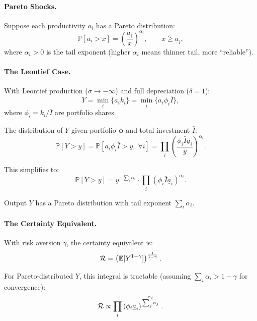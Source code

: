 \paragraph{Pareto Shocks.}
Suppose each productivity $a_i$ has a Pareto distribution:
\begin{equation}
\mathbb{P}[a_i > x] = \left( \frac{\underline{a}_i}{x} \right)^{\alpha_i}, \qquad x \geq \underline{a}_i,
\label{eq:ac-adv-pareto}
\end{equation}
where $\alpha_i > 0$ is the tail exponent (higher $\alpha_i$ means thinner tail, more ``reliable'').

\paragraph{The Leontief Case.}
With Leontief production ($\sigma \to -\infty$) and full depreciation ($\delta = 1$):
\begin{equation}
Y = \min_i \{ a_i k_i \} = \min_i \{ a_i \phi_i \bar{I} \},
\label{eq:ac-adv-Y-leontief}
\end{equation}
where $\phi_i = k_i / \bar{I}$ are portfolio shares.

The distribution of $Y$ given portfolio $\boldsymbol{\phi}$ and total investment $\bar{I}$:
\begin{equation}
\mathbb{P}[Y > y] = \mathbb{P}\left[ a_i \phi_i \bar{I} > y, \; \forall i \right] = \prod_i \left( \frac{\phi_i \bar{I} \underline{a}_i}{y} \right)^{\alpha_i}.
\label{eq:ac-adv-Y-dist}
\end{equation}

This simplifies to:
\begin{equation}
\mathbb{P}[Y > y] = y^{-\sum_i \alpha_i} \cdot \prod_i \left( \phi_i \bar{I} \underline{a}_i \right)^{\alpha_i}.
\label{eq:ac-adv-Y-dist-simple}
\end{equation}

Output $Y$ has a Pareto distribution with tail exponent $\sum_i \alpha_i$.

\paragraph{The Certainty Equivalent.}
With risk aversion $\gamma$, the certainty equivalent is:
\begin{equation}
\mathcal{R} = \left( \mathbb{E}[Y^{1-\gamma}] \right)^{\frac{1}{1-\gamma}}.
\label{eq:ac-adv-CE-pareto}
\end{equation}

For Pareto-distributed $Y$, this integral is tractable (assuming $\sum_i \alpha_i > 1 - \gamma$ for convergence):
\begin{equation}
\mathcal{R} \propto \prod_i \left( \phi_i \underline{a}_i \right)^{\frac{\alpha_i}{\sum_j \alpha_j}}.
\label{eq:ac-adv-CE-closed}
\end{equation}

